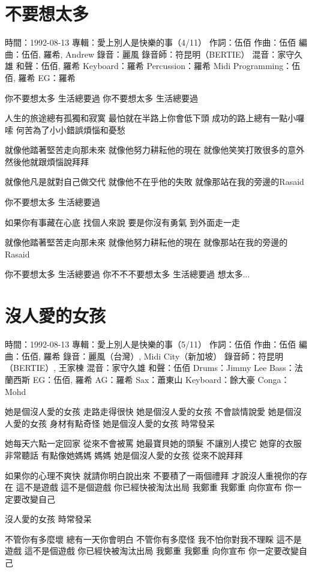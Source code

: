 \documentclass[UTF8,a4paper,oneside,twocolumn,12pt]{ctexbook}
\newcommand{\infopair}[2]{\textbullet #1：#2}
\newcommand{\zc}[1][伍佰]{\infopair{作詞}{#1}}
\newcommand{\zq}[1][伍佰]{\infopair{作曲}{#1}}
\newcommand{\bq}[1][伍佰]{\infopair{編曲}{#1}}
\newcommand{\zj}[1]{\infopair{專輯}{#1}}
\newcommand{\sj}[1]{\infopair{時間}{#1}}
\newenvironment{info}{\begin{flushleft}\kaishu
	}
	{\end{flushleft}\normalsize\yahei\par}
\newenvironment{lyric}{
	}
{}
\begin{document}
\section{不要想太多}
\begin{info}
	\sj{1992-08-13}
	\zj{愛上別人是快樂的事（4/11）}
	\zc
	\zq
	\bq[伍佰, 羅希, Andrew]
	\infopair{錄音}{麗風}
	\infopair{錄音師}{符昆明（BERTIE）}
	\infopair{混音}{家守久雄}
	\infopair{和聲}{伍佰, 羅希}
	\infopair{Keyboard}{羅希}
	\infopair{Percussion}{羅希}
	\infopair{Midi Programming}{伍佰, 羅希}
	\infopair{EG}{羅希}
\end{info}
\begin{lyric}
	你不要想太多  生活總要過
	你不要想太多  生活總要過

	人生的旅途總有孤獨和寂寞
	最怕就在半路上你會低下頭
	成功的路上總有一點小囉嗦
	何苦為了小小錯誤煩惱和憂愁

	就像他踏著堅苦走向那未來
	就像他努力耕耘他的現在
	就像他笑笑打敗很多的意外
	然後他就跟煩惱說拜拜

	就像他凡是就對自己做交代
	就像他不在乎他的失敗
	就像那站在我的旁邊的Rasaid

	你不要想太多  生活總要過

	如果你有事藏在心底  找個人來說
	要是你沒有勇氣  到外面走一走

	就像他踏著堅苦走向那未來
	就像他努力耕耘他的現在
	就像那站在我的旁邊的Rasaid

	你不要想太多  生活總要過
	你不不不要想太多  生活總要過
	想太多...
\end{lyric}

\section{沒人愛的女孩}
\begin{info}
	\sj{1992-08-13}
	\zj{愛上別人是快樂的事（5/11）}
	\zc
	\zq
	\bq[伍佰, 羅希]
	\infopair{錄音}{麗風（台灣）, Midi City（新加坡）}
	\infopair{錄音師}{符昆明（BERTIE）, 王家棟}
	\infopair{混音}{家守久雄}
	\infopair{和聲}{伍佰}
	\infopair{Drums}{Jimmy Lee}
	\infopair{Bass}{法蘭西斯}
	\infopair{EG}{伍佰, 羅希}
	\infopair{AG}{羅希}
	\infopair{Sax}{蕭東山}
	\infopair{Keyboard}{餘大豪}
	\infopair{Conga}{Mohd}
\end{info}
\begin{lyric}
	她是個沒人愛的女孩 走路走得很快
	她是個沒人愛的女孩 不會談情說愛
	她是個沒人愛的女孩 身材有點奇怪
	她是個沒人愛的女孩 時常發呆

	她每天六點一定回家 從來不會被罵
	她最寶貝她的頭髮   不讓別人摸它
	她穿的衣服非常聽話 有點像她媽媽  媽媽
	她是個沒人愛的女孩 從來不說拜拜

	如果你的心理不爽快 就請你明白說出來
	不要積了一兩個禮拜 才說沒人重視你的存在
	這不是遊戲  這不是個遊戲  你已經快被淘汰出局
	我鄭重  我鄭重  向你宣布  你一定要改變自己

	沒人愛的女孩  時常發呆

	不管你有多麼壞  總有一天你會明白
	不管你有多麼怪  我不怕你對我不理睬
	這不是遊戲  這不是個遊戲  你已經快被淘汰出局
	我鄭重  我鄭重  向你宣布  你一定要改變自己
\end{lyric}
\end{document}
